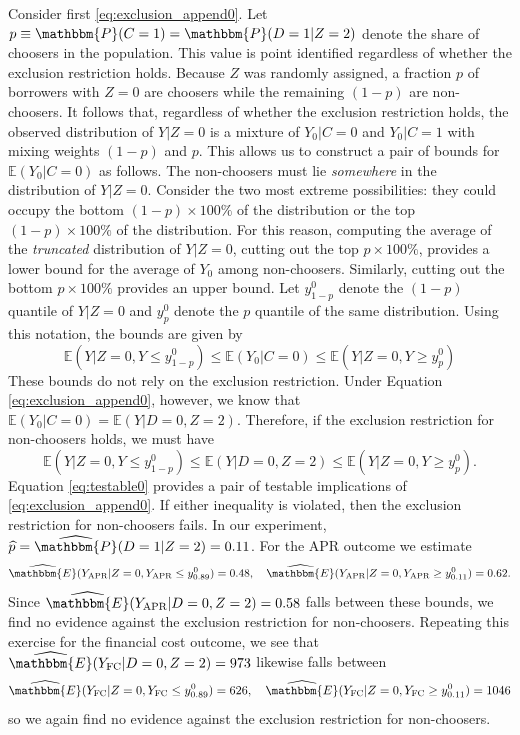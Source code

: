 Consider first \eqref{eq:exclusion_append0}.
Let $p \equiv \mathbbm{P}(C=1) = \mathbbm{P}(D=1|Z=2)$ denote the share of choosers in the population.
This value is point identified regardless of whether the exclusion restriction holds.
Because $Z$ was randomly assigned, a fraction $p$ of borrowers with $Z=0$ are choosers while the remaining $(1-p)$ are non-choosers.
It follows that, regardless of whether the exclusion restriction holds, the observed distribution of $Y|Z=0$ is a mixture of $Y_0|C=0$ and $Y_0|C=1$ with mixing weights $(1-p)$ and $p$.
This allows us to construct a pair of bounds for $\mathbb{E}(Y_0|C=0)$ as follows.
The non-choosers must lie \emph{somewhere} in the distribution of $Y|Z=0$.
Consider the two most extreme possibilities: they could occupy the bottom $(1-p)\times 100\%$ of the distribution or the top $(1-p)\times 100\%$ of the distribution.
For this reason, computing the average of the \emph{truncated} distribution of $Y|Z=0$, cutting out the top $p\times 100\%$, provides a lower bound for the average of $Y_0$ among non-choosers.
Similarly, cutting out the bottom $p \times 100\%$ provides an upper bound.
Let $y^0_{1-p}$ denote the $(1-p)$ quantile of $Y|Z=0$ and $y^0_{p}$ denote the $p$ quantile of the same distribution.
Using this notation, the bounds are given by
\[
\mathbb{E}\left(Y|Z=0, Y\leq y^0_{1-p}\right)\leq \mathbb{E}(Y_0|C=0) \leq \mathbb{E}\left(Y|Z=0, Y \geq y^0_p\right) 
\]
These bounds do not rely on the exclusion restriction.
Under Equation \ref{eq:exclusion_append0}, however, we know that $\mathbb{E}(Y_0|C=0)=\mathbb{E}(Y|D=0,Z=2)$.
Therefore, if the exclusion restriction for non-choosers holds, we must have
\begin{equation}
\mathbb{E}\left(Y|Z=0, Y\leq y^0_{1-p}\right)\leq \mathbb{E}(Y|D=0,Z=2) \leq \mathbb{E}\left(Y|Z=0, Y \geq y^0_p\right).
\label{eq:testable0}
\end{equation}
Equation \ref{eq:testable0} provides a pair of testable implications of \eqref{eq:exclusion_append0}.
If either inequality is violated, then the exclusion restriction for non-choosers fails.
In our experiment, $\widehat{p} = \widehat{\mathbbm{P}}(D=1|Z=2) = 0.11$. For the APR outcome we estimate
\[
\widehat{\mathbbm{E}}(Y_\text{APR}|Z=0,Y_\text{APR}\leq y^0_{0.89}) = 0.48, \quad
\widehat{\mathbbm{E}}(Y_\text{APR}|Z=0, Y_\text{APR}\geq y^0_{0.11}) = 0.62.
\]
Since $\widehat{\mathbbm{E}}(Y_\text{APR}|D=0,Z=2) = 0.58$ falls between these bounds, we find no evidence against the exclusion restriction for non-choosers. 
Repeating this exercise for the financial cost outcome, we see that $\widehat{\mathbbm{E}}(Y_\text{FC}|D=0,Z=2) = 973$ likewise falls between 
\[
\widehat{\mathbbm{E}}(Y_\text{FC}|Z=0,Y_\text{FC}\leq y^0_{0.89}) = 626, \quad
\widehat{\mathbbm{E}}(Y_\text{FC}|Z=0, Y_\text{FC}\geq y^0_{0.11}) = 1046 
\]
so we again find no evidence against the exclusion restriction for non-choosers.

